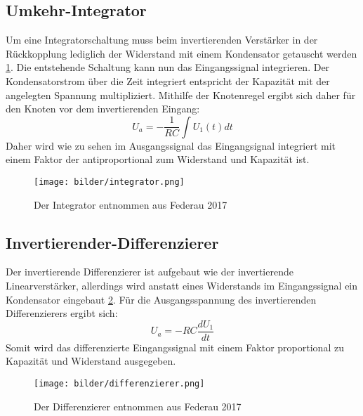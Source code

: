     \subsection{Umkehr-Integrator}
    \label{sec:integrator}
        Um eine Integratorschaltung muss beim invertierenden Verstärker in der Rückkopplung lediglich der Widerstand mit einem Kondensator getauscht werden \ref{fig:integrator}.
        Die entstehende Schaltung kann nun das Eingangssignal integrieren.
        Der Kondensatorstrom über die Zeit integriert entspricht der Kapazität mit der angelegten Spannung multipliziert.
        Mithilfe der Knotenregel ergibt sich daher für den Knoten vor dem invertierenden Eingang:
        \begin{equation*}
            U_a = -\frac{1}{RC} \int U_1(t) dt
        \end{equation*}
        Daher wird wie zu sehen im Ausgangssignal das Eingangsignal integriert mit einem Faktor der antiproportional zum Widerstand und Kapazität ist.
        \begin{figure}[ht]
            \centering
            \texttt{[image: bilder/integrator.png]}
            \caption{Der Integrator entnommen aus Federau 2017}
            \label{fig:integrator}
        \end{figure}
    \subsection{Invertierender-Differenzierer}
        Der invertierende Differenzierer ist aufgebaut wie der invertierende Linearverstärker, allerdings wird anstatt eines Widerstands im Eingangssignal ein Kondensator eingebaut \ref{fig:differenzierer}.
        Für die Ausgangsspannung des invertierenden Differenzierers ergibt sich:
        \begin{equation*}
            U_a = -RC \frac{dU_1}{dt}
        \end{equation*}
        Somit wird das differenzierte Eingangssignal mit einem Faktor proportional zu Kapazität und Widerstand ausgegeben.
        \begin{figure}[ht]
            \centering
            \texttt{[image: bilder/differenzierer.png]}
            \caption{Der Differenzierer entnommen aus Federau 2017}
            \label{fig:differenzierer}
        \end{figure}
